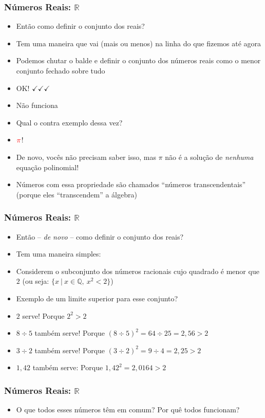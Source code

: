 \documentclass[usenames,dvipsnames,svgnames]{beamer}
\begin{document}
\begin{frame}	
	\frametitle{Números Reais: $\mathbb{R}$}

	\begin{itemize}
		\item Então como definir o conjunto dos reais?
		\item Tem uma maneira que vai (mais ou menos) na linha do que fizemos até agora
		\item Podemos chutar o balde e definir o conjunto dos números reais como o menor conjunto fechado sobre tudo
		\item {\color{ForestGreen}OK! $\checkmark\checkmark\checkmark$}
		\item {\color{red} Não funciona}
		\item Qual o contra exemplo dessa vez?
		\item $\color{red}\pi$!
		\item De novo, vocês não precisam saber isso, mas $\pi$ não é a solução de \emph{nenhuma} equação polinomial!
		\item Números com essa propriedade são chamados ``números transcendentais'' (porque eles ``transcendem'' a álgebra)
	\end{itemize}
\end{frame}

\begin{frame}	
	\frametitle{Números Reais: $\mathbb{R}$}

	\begin{itemize}
		\item Então -- \emph{de novo} -- como definir o conjunto dos reais?
		\item Tem uma maneira simples:
		\item Considerem o subconjunto dos números racionais cujo quadrado é menor que $2$ (ou seja: $\{x ~|~ x \in \mathbb{Q},~ x^2 < 2\}$)
		\item Exemplo de um limite superior para esse conjunto?
		\item $2$ serve! Porque $2^2 > 2$
		\item $8 \div 5$ também serve! Porque $(8 \div 5)^2 = 64 \div 25 = 2,56 > 2$
		\item $3 \div 2$ também serve! Porque $(3 \div 2)^2 = 9 \div 4 = 2,25 > 2$
		\item $1,42$ também serve: Porque $1,42^2 = 2,0164 > 2$
	\end{itemize}
\end{frame}

\begin{frame}	
	\frametitle{Números Reais: $\mathbb{R}$}

	\begin{itemize}
		\item O que todos esses números têm em comum? Por quê todos funcionam?
	\end{itemize}
\end{frame}
\end{document}

